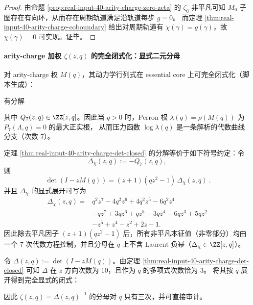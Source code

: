 \begin{proof}
由命题 \ref{prop:real-input-40-arity-charge-zero-zeta} 的 $\zeta_0$ 非平凡可知 $M_0$ 子图存在有向环，从而存在周期轨道满足沿轨道每步 $g=0$。
而定理 \ref{thm:real-input-40-arity-charge-coboundary} 给出对周期轨道有 $\chi(\gamma)=g(\gamma)$，故 $\chi(\gamma)=0$ 可实现。证毕。
\end{proof}

\paragraph{arity-charge 加权 $\zeta(z,q)$ 的完全闭式化：显式二元分母}
对 arity-charge 权 $M(q)$，其动力学行列式在 essential core 上可完全闭式化（脚本生成）：
\begin{theorem}[两变量行列式闭式与代数压力（度 $7$）]\label{thm:real-input-40-arity-charge-det-closed}
有分解

其中 $Q_7(z,q)\in\ZZ[z,q]$。因此当 $q>0$ 时，Perron 根 $\lambda(q)=\rho(M(q))$ 为 $P_7(\Lambda,q)=0$ 的最大正实根，
从而压力函数 $\log\lambda(q)$ 是一条解析的代数曲线分支（次数 $7$）。
\end{theorem}

\begin{remark}\label{rem:real-input-40-arity-charge-delta-chi}
定理 \ref{thm:real-input-40-arity-charge-det-closed} 的分解等价于如下符号约定：令
\[
\Delta_\chi(z,q):=-Q_7(z,q),
\]
则
\[
\boxed{\ \det(I-zM(q))=(z+1)(qz^2-1)\,\Delta_\chi(z,q)\ }.
\]
并且 \(\Delta_\chi\) 的显式展开可写为
\[
\boxed{
\begin{aligned}
\Delta_\chi(z,q)
={}&q^2z^7-4q^2z^6+4q^2z^5-6q^2z^4\\
&-qz^7+3qz^6+qz^5+3qz^4-6qz^3+5qz^2\\
&-z^5+z^4-z^2+2z-1.
\end{aligned}}
\]
因此除去平凡因子 \((z+1)(qz^2-1)\) 后，所有非平凡本征值（非零部分）均由一个 \(7\) 次代数方程控制，并且分母在 \(q\) 上不含 Laurent 负幂（\(\Delta_\chi\in\ZZ[z,q]\)）。
\end{remark}

\begin{remark}\label{rem:real-input-40-arity-charge-det-q-cubic}
令 $\Delta(z,q):=\det(I-zM(q))$。由定理 \ref{thm:real-input-40-arity-charge-det-closed} 可知 $\Delta$ 在 $z$ 方向次数为 $10$，且作为 $q$ 的多项式次数恰为 $3$。
将其按 $q$ 展开得到完全显式的闭式：

因此 $\zeta(z,q)=\Delta(z,q)^{-1}$ 的分母对 $q$ 只有三次，并可直接审计。
\end{remark}

